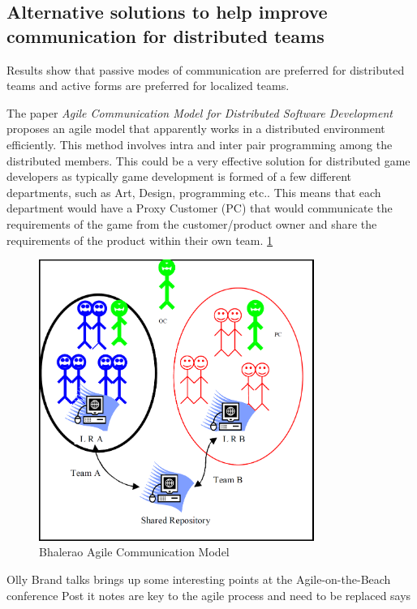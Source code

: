 \documentclass{scrartcl}
\begin{document}
\subsection{Alternative solutions to help improve communication for distributed teams}

Results show that passive modes of communication are preferred for distributed teams and active forms are preferred for localized teams. \cite{joshi2013}


The paper \textit{Agile Communication Model for Distributed Software Development} \cite{bhalerao2010} proposes an agile model that apparently works in a distributed environment efficiently. This method involves intra and inter pair programming among the distributed members. This could be a very effective solution for distributed game developers as typically game development is formed of a few different departments, such as Art, Design, programming etc.. This means that each department would have a Proxy Customer (PC) that would communicate the requirements of the game from the customer/product owner and share the requirements of the product within their own team. \ref{fig:Agile Communication Model}


\begin{figure}[p]
    \centering
    \includegraphics[width=0.8\textwidth]{ACMDSD}
    \caption{Bhalerao Agile Communication Model}
    \label{fig:Agile Communication Model}
\end{figure}


Olly Brand talks brings up some interesting points at the Agile-on-the-Beach conference \cite{OllyBrandLiveBlog2015}
Post it notes are key to the agile process and need to be replaced says 
\end{document}

